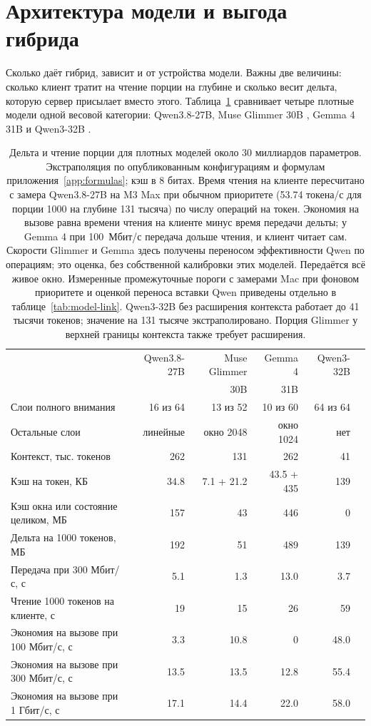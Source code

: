 \section{Архитектура модели и выгода гибрида}
\label{sec:models}

Сколько даёт гибрид, зависит и от устройства модели. Важны две величины: сколько клиент тратит на чтение порции на
глубине и сколько весит дельта, которую сервер присылает вместо этого. Таблица~\ref{tab:arch} сравнивает четыре
плотные модели одной весовой категории: Qwen3.8-27B, Muse Glimmer 30B \cite{glimmer30b}, Gemma 4 31B
\cite{gemma4} и Qwen3-32B \cite{qwen3}.

\begin{table}[t]
\centering
\caption{Дельта и чтение порции для плотных моделей около 30 миллиардов параметров. Экстраполяция по опубликованным
конфигурациям и формулам приложения~\ref{app:formulas}; кэш в 8 битах. Время чтения на клиенте пересчитано с замера
Qwen3.8-27B на M3 Max при обычном приоритете (53.74 токена/с для порции 1000 на глубине 131 тысяча) по числу операций на токен. Экономия на вызове
равна времени чтения на клиенте минус время передачи дельты; у Gemma 4 при 100~Мбит/с передача дольше чтения, и клиент
читает сам. Скорости Glimmer и Gemma здесь получены переносом эффективности Qwen по операциям; это оценка,
без собственной калибровки этих моделей. Передаётся всё живое окно.
Измеренные промежуточные пороги с замерами Mac при фоновом приоритете и оценкой переноса вставки Qwen приведены отдельно в таблице~\ref{tab:model-link}.
Qwen3-32B без расширения контекста работает до 41 тысячи токенов; значение на 131 тысяче экстраполировано.
Порция Glimmer у верхней границы контекста также требует расширения.}
\label{tab:arch}
\footnotesize
\begin{tabular}{lrrrrr}
\toprule
 & Qwen3.8-27B & Muse Glimmer & Gemma 4 & Qwen3-32B \\
 &  & 30B & 31B & \\
\midrule
Слои полного внимания & 16 из 64 & 13 из 52 & 10 из 60 & 64 из 64 \\
Остальные слои & линейные & окно 2048 & окно 1024 & нет \\
Контекст, тыс. токенов & 262 & 131 & 262 & 41 \\
Кэш на токен, КБ & 34.8 & 7.1 + 21.2 & 43.5 + 435 & 139 \\
Кэш окна или состояние целиком, МБ & 157 & 43 & 446 & 0 \\
Дельта на 1000 токенов, МБ & 192 & 51 & 489 & 139 \\
Передача при 300 Мбит/с, с & 5.1 & 1.3 & 13.0 & 3.7 \\
Чтение 1000 токенов на клиенте, с & 19 & 15 & 26 & 59 \\
\midrule
Экономия на вызове при 100 Мбит/с, с & 3.3 & 10.8 & 0 & 48.0 \\
Экономия на вызове при 300 Мбит/с, с & 13.5 & 13.5 & 12.8 & 55.4 \\
Экономия на вызове при 1 Гбит/с, с & 17.1 & 14.4 & 22.0 & 58.0 \\
\bottomrule
\end{tabular}
\end{table}

